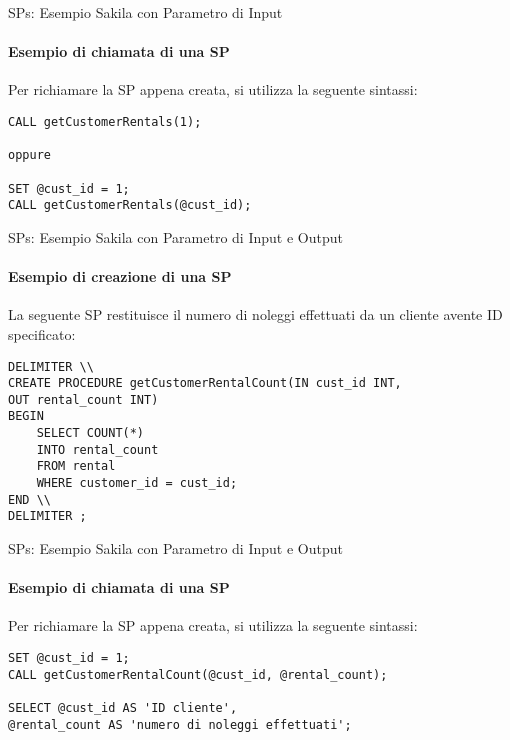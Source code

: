 %
\begin{frame}[fragile]{SPs: Esempio Sakila con Parametro di Input}
\framesubtitle{Esempio di chiamata di una SP}
Per richiamare la SP appena creata, si utilizza la seguente sintassi:
\small 
\begin{lstlisting}
CALL getCustomerRentals(1);

oppure

SET @cust_id = 1;
CALL getCustomerRentals(@cust_id);
\end{lstlisting}
\end{frame}
\begin{frame}[fragile]{SPs: Esempio Sakila con Parametro di Input e Output}
\framesubtitle{Esempio di creazione di una SP}
La seguente SP restituisce il numero di noleggi effettuati da un cliente avente ID specificato:
\small
\begin{lstlisting}
DELIMITER \\
CREATE PROCEDURE getCustomerRentalCount(IN cust_id INT,
OUT rental_count INT)
BEGIN
    SELECT COUNT(*)
    INTO rental_count
    FROM rental
    WHERE customer_id = cust_id;
END \\
DELIMITER ;
\end{lstlisting}
\end{frame}
%
\begin{frame}[fragile]{SPs: Esempio Sakila con Parametro di Input e Output}
\framesubtitle{Esempio di chiamata di una SP}
Per richiamare la SP appena creata, si utilizza la seguente sintassi:
\small 
\begin{lstlisting}
SET @cust_id = 1;
CALL getCustomerRentalCount(@cust_id, @rental_count);

SELECT @cust_id AS 'ID cliente',
@rental_count AS 'numero di noleggi effettuati';
\end{lstlisting}
\end{frame}